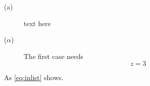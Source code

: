 \documentclass{article}
\begin{document}
\begin{description}
\item[(a)] text here
\item[($\alpha$)] The first case needs
\begin{equation}\label{eq:inlist}z=3\end{equation}
\end{description}
As \eqref{eq:inlist} shows.
\end{document}
